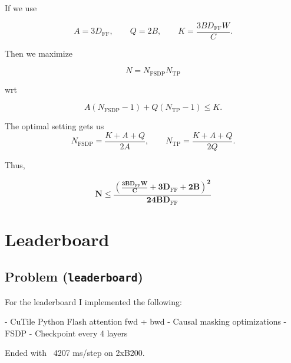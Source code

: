 \documentclass[11pt]{article}
\begin{document}
If we use

\[
A = 3D_{\mathrm{FF}},
\qquad
Q = 2B,
\qquad
K = \frac{3 B D_{\mathrm{FF}} W}{C}.
\]

Then we maximize

\[
N = N_{\mathrm{FSDP}}N_{\mathrm{TP}}
\]

wrt

\[
A(N_{\mathrm{FSDP}} - 1)
+
Q(N_{\mathrm{TP}} - 1)
\le K.
\]

The optimal setting gets us
\[
N_{\mathrm{FSDP}}
=
\frac{K + A + Q}{2A},
\qquad
N_{\mathrm{TP}}
=
\frac{K + A + Q}{2Q}.
\]

Thus,

\[
\mathbf{
N
\le
\frac{
\left(
\frac{3 B D_{\mathrm{FF}} W}{C}
+
3D_{\mathrm{FF}}
+
2B
\right)^2
}
{24 B D_{\mathrm{FF}}}
}
\]


\vspace{4em}

\newpage


\section{Leaderboard}




\subsection{Problem (\texttt{leaderboard})}

For the leaderboard I implemented the following:

- CuTile Python Flash attention fwd + bwd
- Causal masking optimizations
- FSDP
- Checkpoint every 4 layers


Ended with ~4207 ms/step on 2xB200.
\vspace{6em}
\end{document}
